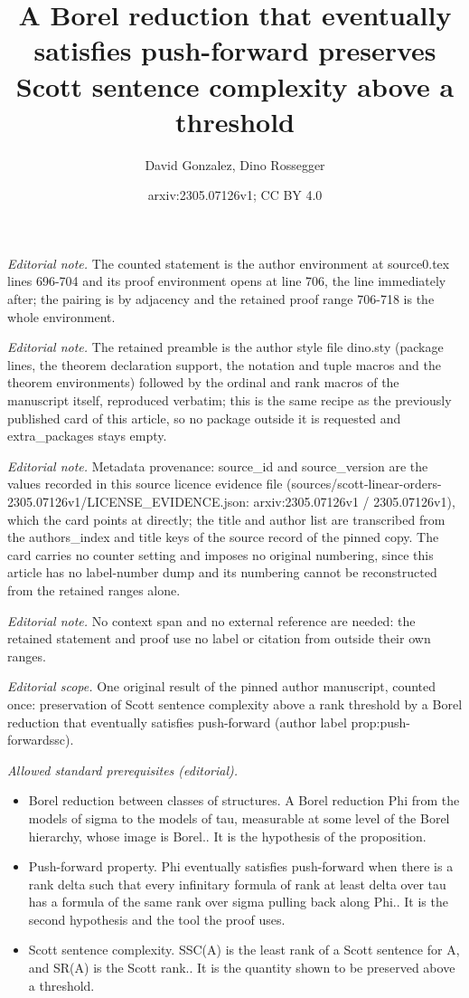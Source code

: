 \documentclass[10pt,a4paper]{amsart}
\title{A Borel reduction that eventually satisfies push-forward preserves Scott sentence complexity above a threshold}
\author{David Gonzalez, Dino Rossegger}
\date{arxiv:2305.07126v1; CC BY 4.0}
\begin{document}
\maketitle
\noindent\textit{Editorial note.} The counted statement is the author environment at source0.tex lines 696-704 and its proof environment opens at line 706, the line immediately after; the pairing is by adjacency and the retained proof range 706-718 is the whole environment.\par\medskip
\noindent\textit{Editorial note.} The retained preamble is the author style file dino.sty (package lines, the theorem declaration support, the notation and tuple macros and the theorem environments) followed by the ordinal and rank macros of the manuscript itself, reproduced verbatim; this is the same recipe as the previously published card of this article, so no package outside it is requested and extra\_packages stays empty.\par\medskip
\noindent\textit{Editorial note.} Metadata provenance: source\_id and source\_version are the values recorded in this source licence evidence file (sources/scott-linear-orders-2305.07126v1/LICENSE\_EVIDENCE.json: arxiv:2305.07126v1 / 2305.07126v1), which the card points at directly; the title and author list are transcribed from the authors\_index and title keys of the source record of the pinned copy. The card carries no counter setting and imposes no original numbering, since this article has no label-number dump and its numbering cannot be reconstructed from the retained ranges alone.\par\medskip
\noindent\textit{Editorial note.} No context span and no external reference are needed: the retained statement and proof use no label or citation from outside their own ranges.\par\medskip
\noindent\textit{Editorial scope.} One original result of the pinned author manuscript, counted once: preservation of Scott sentence complexity above a rank threshold by a Borel reduction that eventually satisfies push-forward (author label prop:push-forwardssc).\par\medskip
\noindent\textit{Allowed standard prerequisites (editorial).}\begin{itemize}
\item Borel reduction between classes of structures. A Borel reduction Phi from the models of sigma to the models of tau, measurable at some level of the Borel hierarchy, whose image is Borel.. It is the hypothesis of the proposition.
\item Push-forward property. Phi eventually satisfies push-forward when there is a rank delta such that every infinitary formula of rank at least delta over tau has a formula of the same rank over sigma pulling back along Phi.. It is the second hypothesis and the tool the proof uses.
\item Scott sentence complexity. SSC(A) is the least rank of a Scott sentence for A, and SR(A) is the Scott rank.. It is the quantity shown to be preserved above a threshold.
\end{itemize}\medskip
\end{document}
